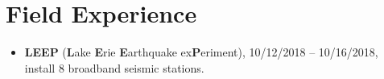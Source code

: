 \section*{Field Experience}
\begin{itemize}
\item \textbf{LEEP} (\textbf{L}ake \textbf{E}rie \textbf{E}arthquake ex\textbf{P}eriment),
      10/12/2018 -- 10/16/2018, install 8 broadband seismic stations.
\end{itemize}
